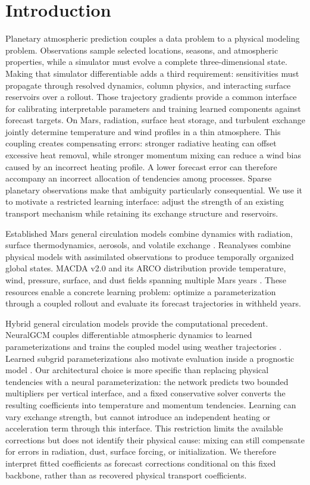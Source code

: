 \documentclass{article}
\begin{document}
\section{Introduction}
Planetary atmospheric prediction couples a data problem to a physical modeling
problem. Observations sample selected locations, seasons, and atmospheric
properties, while a simulator must evolve a complete three-dimensional state.
Making that simulator differentiable adds a third requirement: sensitivities
must propagate through resolved dynamics, column physics, and interacting
surface reservoirs over a rollout. Those trajectory gradients provide a common
interface for calibrating interpretable parameters and training learned
components against forecast targets.
On Mars, radiation, surface heat storage, and turbulent exchange jointly
determine temperature and wind profiles in a thin atmosphere. This coupling
creates compensating errors: stronger radiative heating can offset excessive
heat removal, while stronger momentum mixing can reduce a wind bias caused by
an incorrect heating profile. A lower forecast error can therefore accompany
an incorrect allocation of tendencies among processes. Sparse planetary
observations make that ambiguity particularly consequential. We use it to
motivate a restricted learning interface: adjust the strength of an existing
transport mechanism while retaining its exchange structure and reservoirs.

Established Mars general circulation models combine dynamics with radiation,
surface thermodynamics, aerosols, and volatile exchange
\citep{forget1999improved,haberle2019ames}. Reanalyses combine physical
models with assimilated observations to produce temporally organized global
states. MACDA v2.0 and its ARCO distribution provide temperature, wind, pressure,
surface, and dust fields spanning multiple Mars years
\citep{valeanu2026macda,bhattacharya2026arcomars}. These resources enable a
concrete learning problem: optimize a parameterization through a coupled
rollout and evaluate its forecast trajectories in withheld years.

Hybrid general circulation models provide the computational precedent.
NeuralGCM couples differentiable atmospheric dynamics to learned
parameterizations and trains the coupled model using weather trajectories
\citep{kochkov2024neuralgcm}. Learned subgrid parameterizations also motivate
evaluation inside a prognostic model \citep{yuval2020stable}. Our architectural
choice is more specific than replacing physical tendencies with a neural
parameterization: the network predicts two bounded multipliers per vertical
interface, and a fixed conservative solver converts the resulting coefficients
into temperature and momentum tendencies. Learning can vary exchange strength,
but cannot introduce an independent heating or acceleration term through this
interface. This restriction limits the available corrections but does not identify their
physical cause: mixing can still compensate for errors in radiation, dust,
surface forcing, or initialization. We therefore interpret fitted coefficients
as forecast corrections conditional on this fixed backbone, rather than as
recovered physical transport coefficients.
\end{document}
